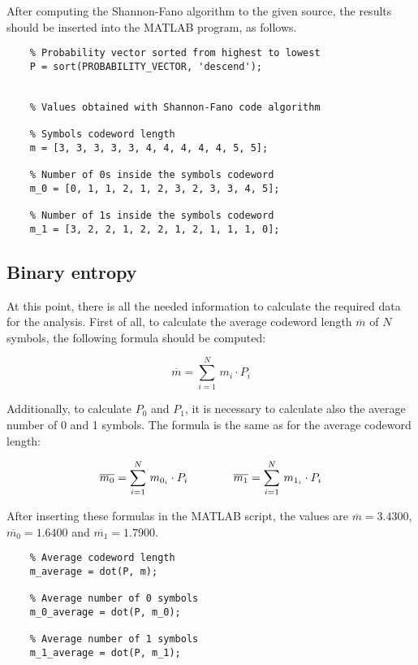 \FloatBarrier \noindent After computing the Shannon-Fano algorithm to the given source, the results should be inserted into the MATLAB program, as follows.

\begin{lstlisting}
    % Probability vector sorted from highest to lowest
    P = sort(PROBABILITY_VECTOR, 'descend');


    % Values obtained with Shannon-Fano code algorithm

    % Symbols codeword length
    m = [3, 3, 3, 3, 3, 4, 4, 4, 4, 4, 5, 5]; 

    % Number of 0s inside the symbols codeword
    m_0 = [0, 1, 1, 2, 1, 2, 3, 2, 3, 3, 4, 5];

    % Number of 1s inside the symbols codeword
    m_1 = [3, 2, 2, 1, 2, 2, 1, 2, 1, 1, 1, 0];
\end{lstlisting}


\subsection{Binary entropy}
At this point, there is all the needed information to calculate the required data for the analysis. First of all, to calculate the average codeword length $\overline{m}$ of $N$ symbols, the following formula should be computed:

\begin{equation*}
    \overline{m} = \sum_{i = 1}^N\,m_i \cdot P_i 
\end{equation*}

\noindent Additionally, to calculate $P_0$ and $P_1$, it is necessary to calculate also the average number of 0 and 1 symbols. The formula is the same as for the average codeword length:

\begin{equation*}
    \overline{m_0} = \sum_{i = 1}^N\,m_{0_i} \cdot P_i 
    \hspace*{40px}
    \overline{m_1} = \sum_{i = 1}^N\,m_{1_i} \cdot P_i
\end{equation*}

\noindent After inserting these formulas in the MATLAB script, the values are $\overline{m} = 3.4300$, $\overline{m_0} = 1.6400$ and $\overline{m_1} = 1.7900$.

\begin{lstlisting}
    % Average codeword length
    m_average = dot(P, m); 

    % Average number of 0 symbols
    m_0_average = dot(P, m_0);

    % Average number of 1 symbols
    m_1_average = dot(P, m_1);
\end{lstlisting}


